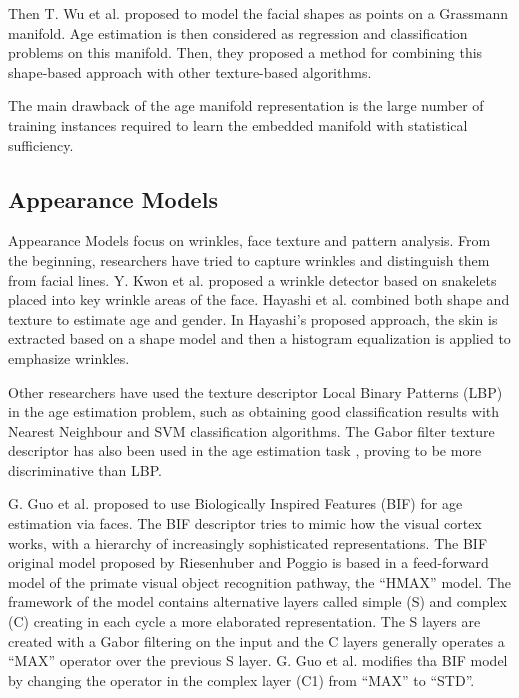 Then T. Wu et al. \cite{journals/tifs/WuTC12} proposed to model the facial shapes as points on a Grassmann manifold. Age estimation is then considered as regression and classification problems on this manifold. Then, they proposed a method for combining this shape-based approach with other texture-based algorithms.

The main drawback of the age manifold representation is the large number of training instances required to learn the embedded manifold with statistical sufficiency.

\subsection{Appearance Models}

Appearance Models focus on wrinkles, face texture and pattern analysis. From the beginning, researchers have tried to capture wrinkles and distinguish them from facial lines. Y. Kwon et al. \cite{Kwon:1999:ACF:311844.311845} proposed a wrinkle detector based on snakelets \cite{Kass88snakes:active} placed into key wrinkle areas of the face. Hayashi et al. \cite{969698} \cite{1195171} \cite{conf/icpr/HayashiYIK02} combined both shape and texture to estimate age and gender. In Hayashi's proposed approach, the skin is extracted based on a shape model and then a histogram equalization is applied to emphasize wrinkles.

Other researchers have used the texture descriptor Local Binary Patterns (LBP) \cite{Ahonen:2006:FDL:1175897.1176245} in the age estimation problem, such as \cite{4717926} \cite{6460367} obtaining good classification results with Nearest Neighbour and SVM classification algorithms. The Gabor \cite{Liu:2002:GFB:2319007.2320264} filter texture descriptor has also been used in the age estimation task  \cite{Gao:2009:FAC:1567988.1568003}, proving to be more discriminative than LBP.

G. Guo et al. \cite{conf/cvpr/GuoMFH09} proposed to use Biologically Inspired Features (BIF) \cite{Riesenhuber99hierarchicalmodels} for age estimation via faces. The BIF descriptor tries to mimic how the visual cortex works, with a hierarchy of increasingly sophisticated representations. The BIF original model proposed by Riesenhuber and Poggio \cite{Riesenhuber99hierarchicalmodels} is based in a feed-forward model of the primate visual object recognition pathway, the ``HMAX'' model. The framework of the model contains alternative layers called simple (S) and complex (C) creating in each cycle a more elaborated representation. The S layers are created with a Gabor filtering on the input and the C layers generally operates a ``MAX'' operator over the previous S layer. G. Guo et al. \cite{conf/cvpr/GuoMFH09} modifies tha BIF model by changing the operator in the complex layer (C1) from ``MAX'' to ``STD''.

